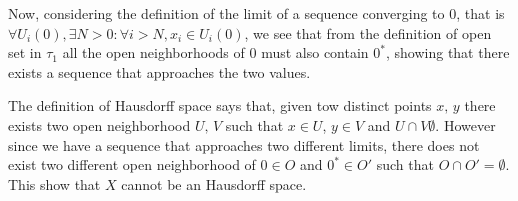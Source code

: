 \documentclass{article}
\begin{document}
    Now, considering the definition of the limit of a sequence converging to $0$, that is $\forall U_i(0), \exists N>0: \forall i>N, x_i \in U_i(0)$, we see that from the definition of open set in $\tau_1$ all the open neighborhoods of $0$ must also contain $0^*$, showing that there exists a sequence that approaches the two values.

    The definition of Hausdorff space says that, given tow distinct points $x,\, y$ there exists two open neighborhood $U,\, V$ such that $x\in U$, $y\in V$ and $U\cap V \emptyset$. However since we have a sequence that approaches two different limits, there does not exist two different open neighborhood of $0 \in O$ and $0^* \in O'$ such that $O \cap O' = \emptyset $. This show that $X$ cannot be an Hausdorff space.
\end{document}
